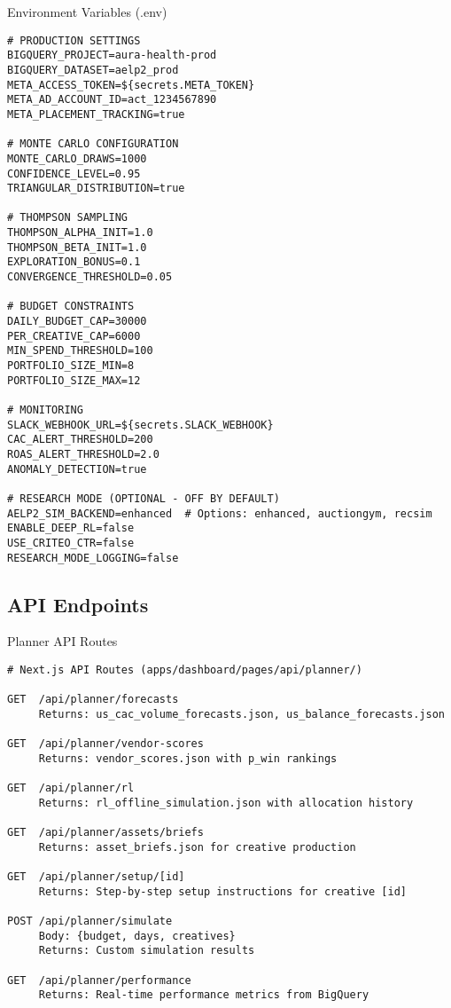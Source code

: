 \documentclass[11pt,a4paper]{report}
\begin{document}
\begin{techbox}{Environment Variables (.env)}
\begin{verbatim}
# PRODUCTION SETTINGS
BIGQUERY_PROJECT=aura-health-prod
BIGQUERY_DATASET=aelp2_prod
META_ACCESS_TOKEN=${secrets.META_TOKEN}
META_AD_ACCOUNT_ID=act_1234567890
META_PLACEMENT_TRACKING=true

# MONTE CARLO CONFIGURATION
MONTE_CARLO_DRAWS=1000
CONFIDENCE_LEVEL=0.95
TRIANGULAR_DISTRIBUTION=true

# THOMPSON SAMPLING
THOMPSON_ALPHA_INIT=1.0
THOMPSON_BETA_INIT=1.0
EXPLORATION_BONUS=0.1
CONVERGENCE_THRESHOLD=0.05

# BUDGET CONSTRAINTS
DAILY_BUDGET_CAP=30000
PER_CREATIVE_CAP=6000
MIN_SPEND_THRESHOLD=100
PORTFOLIO_SIZE_MIN=8
PORTFOLIO_SIZE_MAX=12

# MONITORING
SLACK_WEBHOOK_URL=${secrets.SLACK_WEBHOOK}
CAC_ALERT_THRESHOLD=200
ROAS_ALERT_THRESHOLD=2.0
ANOMALY_DETECTION=true

# RESEARCH MODE (OPTIONAL - OFF BY DEFAULT)
AELP2_SIM_BACKEND=enhanced  # Options: enhanced, auctiongym, recsim
ENABLE_DEEP_RL=false
USE_CRITEO_CTR=false
RESEARCH_MODE_LOGGING=false
\end{verbatim}
\end{techbox}

\subsection{API Endpoints}

\begin{techbox}{Planner API Routes}
\begin{verbatim}
# Next.js API Routes (apps/dashboard/pages/api/planner/)

GET  /api/planner/forecasts
     Returns: us_cac_volume_forecasts.json, us_balance_forecasts.json

GET  /api/planner/vendor-scores
     Returns: vendor_scores.json with p_win rankings

GET  /api/planner/rl
     Returns: rl_offline_simulation.json with allocation history

GET  /api/planner/assets/briefs
     Returns: asset_briefs.json for creative production

GET  /api/planner/setup/[id]
     Returns: Step-by-step setup instructions for creative [id]

POST /api/planner/simulate
     Body: {budget, days, creatives}
     Returns: Custom simulation results

GET  /api/planner/performance
     Returns: Real-time performance metrics from BigQuery
\end{verbatim}
\end{techbox}
\end{document}
